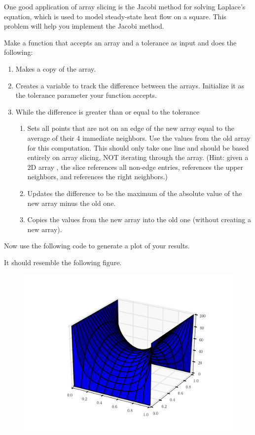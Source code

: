 \begin{problem} 
One good application of array slicing is the Jacobi
method for solving Laplace's equation, which is used to model
steady-state heat flow on a square. This problem will help you implement the Jacobi method.

Make a function that accepts an array and a tolerance as input and does the
following: 
\begin{enumerate}
\item Makes a copy of the array. 
\item Creates a variable to track the difference between the arrays. Initialize
it as the tolerance parameter your function accepts. 
\item While the difference is greater than or equal
to the tolerance 
\begin{enumerate} 
\item Sets all points that are not on an edge of the new array equal to the average of their 4 immediate neighbors. Use the values from the old array for this computation. 
This should only take one line and should be based entirely on array slicing, NOT iterating through the array.
(Hint: given a 2D array , the slice  references
all non-edge entries,  references the upper neighbors,
and  references the right neighbors.) 
\item Updates the difference to be the maximum of the absolute value of the new array
minus the old one. 
\item Copies the values from the new array into the old
one (without creating a new array). 
\end{enumerate} 
\end{enumerate}

Now use the following code to generate a plot of your results.
 
It should resemble the following figure.

\begin{figure} [H]
\includegraphics[width=.75\textwidth]{laplace.pdf}
\end{figure} 
\end{problem}


